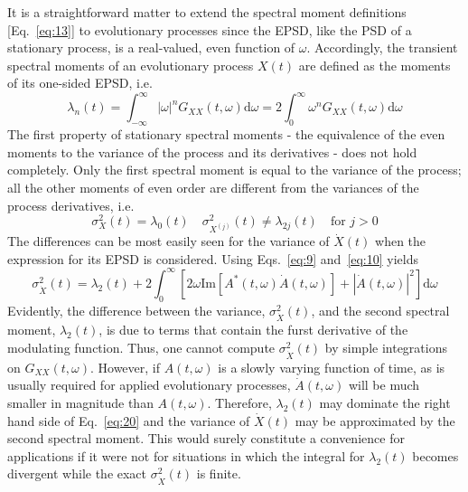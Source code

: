 \documentclass{article}
\begin{document}
It is a straightforward matter to extend the spectral moment definitions
[Eq.~\eqref{eq:13}] to evolutionary processes since the EPSD, like the PSD of
a stationary process, is a real-valued, even function of $\omega$.
Accordingly, the transient spectral moments of an evolutionary process $X (t)$
are defined as the moments of its one-sided EPSD, i.e.
\begin{equation}
  \lambda_n (t) = \int_{- \infty}^{\infty} | \omega |^n G_{XX} (t, \omega)
  \mathrm{d} \omega = 2 \int_0^{\infty} \omega^n G_{XX} (t, \omega) \mathrm{d}
  \omega \label{eq:18}
\end{equation}
The first property of stationary spectral moments - the equivalence of the
even moments to the variance of the process and its derivatives - does not
hold completely. Only the first spectral moment is equal to the variance of
the process; all the other moments of even order are different from the
variances of the process derivatives, i.e.
\begin{equation}
  \sigma_X^2 (t) = \lambda_0 (t)  \quad \sigma_{X^{(j)}}^2 (t) \neq \lambda_{2
  j} (t)  \quad \text{for } j > 0 \label{eq:19}
\end{equation}
The differences can be most easily seen for the variance of $\dot{X} (t)$ when
the expression for its EPSD is considered. Using Eqs.~\eqref{eq:9}
and~\eqref{eq:10} yields
\begin{equation}
  \sigma_{\dot{X}}^2 (t) = \lambda_2 (t) + 2 \int_0^{\infty} [2 \omega
  \mathrm{Im} [A^{\ast} (t, \omega) \dot{A} (t, \omega)] + | \dot{A} (t,
  \omega) |^2] \mathrm{d} \omega \label{eq:20}
\end{equation}
Evidently, the difference between the variance, $\sigma_{\dot{X}}^2 (t)$, and
the second spectral moment, $\lambda_2 (t)$, is due to terms that contain the
furst derivative of the modulating function. Thus, one cannot compute
$\sigma_{\dot{X}}^2 (t)$ by simple integrations on $G_{XX} (t, \omega)$.
However, if $A (t, \omega)$ is a slowly varying function of time, as is
usually required for applied evolutionary processes, $\dot{A} (t, \omega)$
will be much smaller in magnitude than $A (t, \omega)$. Therefore, $\lambda_2
(t)$ may dominate the right hand side of Eq.~\eqref{eq:20} and the variance of
$\dot{X} (t)$ may be approximated by the second spectral moment. This would
surely constitute a convenience for applications if it were not for situations
in which the integral for $\lambda_2 (t)$ becomes divergent while the exact
$\sigma_{\dot{X}}^2 (t)$ is finite.
\end{document}
